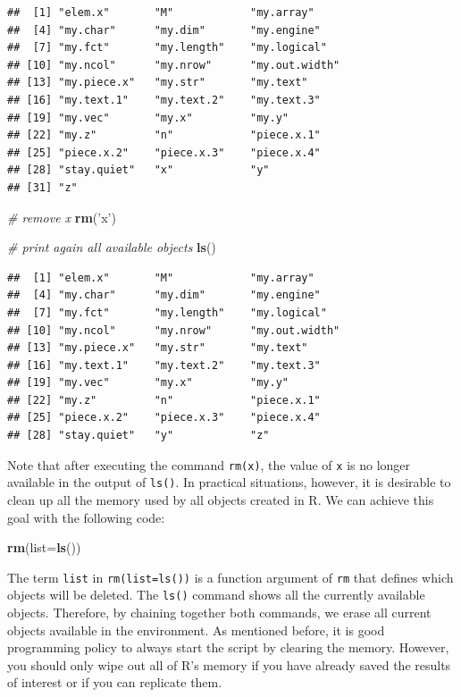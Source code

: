 \documentclass[11pt,]{book}
\newenvironment{Shaded}{\begin{snugshade}}{\end{snugshade}}
\newcommand{\KeywordTok}[1]{\textcolor[rgb]{0.27,0.27,0.27}{\textbf{#1}}}
\newcommand{\DataTypeTok}[1]{\textcolor[rgb]{0.27,0.27,0.27}{#1}}
\newcommand{\StringTok}[1]{\textcolor[rgb]{0.5,0.5,0.5}{#1}}
\newcommand{\CommentTok}[1]{\textcolor[rgb]{0.56,0.35,0.01}{\textit{#1}}}
\newcommand{\NormalTok}[1]{#1}
\begin{document}
\begin{verbatim}
##  [1] "elem.x"       "M"            "my.array"    
##  [4] "my.char"      "my.dim"       "my.engine"   
##  [7] "my.fct"       "my.length"    "my.logical"  
## [10] "my.ncol"      "my.nrow"      "my.out.width"
## [13] "my.piece.x"   "my.str"       "my.text"     
## [16] "my.text.1"    "my.text.2"    "my.text.3"   
## [19] "my.vec"       "my.x"         "my.y"        
## [22] "my.z"         "n"            "piece.x.1"   
## [25] "piece.x.2"    "piece.x.3"    "piece.x.4"   
## [28] "stay.quiet"   "x"            "y"           
## [31] "z"
\end{verbatim}

\begin{Shaded}
\begin{Highlighting}[]
\CommentTok{# remove x}
\KeywordTok{rm}\NormalTok{(}\StringTok{'x'}\NormalTok{)}

\CommentTok{# print again all available objects}
\KeywordTok{ls}\NormalTok{()}
\end{Highlighting}
\end{Shaded}

\begin{verbatim}
##  [1] "elem.x"       "M"            "my.array"    
##  [4] "my.char"      "my.dim"       "my.engine"   
##  [7] "my.fct"       "my.length"    "my.logical"  
## [10] "my.ncol"      "my.nrow"      "my.out.width"
## [13] "my.piece.x"   "my.str"       "my.text"     
## [16] "my.text.1"    "my.text.2"    "my.text.3"   
## [19] "my.vec"       "my.x"         "my.y"        
## [22] "my.z"         "n"            "piece.x.1"   
## [25] "piece.x.2"    "piece.x.3"    "piece.x.4"   
## [28] "stay.quiet"   "y"            "z"
\end{verbatim}

Note that after executing the command
\texttt{rm(\textquotesingle{}x\textquotesingle{})}, the value of
\texttt{x} is no longer available in the output of \texttt{ls()}. In
practical situations, however, it is desirable to clean up all the
memory used by all objects created in R. We can achieve this goal with
the following code:

\begin{Shaded}
\begin{Highlighting}[]
\KeywordTok{rm}\NormalTok{(}\DataTypeTok{list=}\KeywordTok{ls}\NormalTok{())}
\end{Highlighting}
\end{Shaded}

The term \texttt{list} in \texttt{rm(list=ls())} is a function argument
of \texttt{rm} that defines which objects will be deleted. The
\texttt{ls()} command shows all the currently available objects.
Therefore, by chaining together both commands, we erase all current
objects available in the environment. As mentioned before, it is good
programming policy to always start the script by clearing the memory.
However, you should only wipe out all of R's memory if you have already
saved the results of interest or if you can replicate them.
\end{document}
